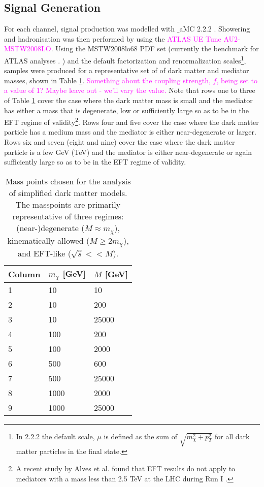 \subsection{Signal Generation}
\label{signal_generation}
\begin{flushleft}
For each channel, signal production was modelled with $\_$aMC 2.2.2 . Showering and hadronisation was then performed by  using the \textcolor{magenta}{ATLAS UE Tune AU2-MSTW2008LO}. Using the MSTW2008lo68 PDF set (currently the benchmark for ATLAS analyses \cite{}. ) and the default \MG factorization and renormalization scales\footnote{In  2.2.2 the default scale, $\mu$ is defined as the sum of $\sqrt{m_{\chi}^{2} + p_{T}^{2}}$ for all dark matter particles in the final state.}, samples were produced for a representative set of of dark matter and mediator masses, shown in Table \ref{Mass_coup_points}. \textcolor{magenta}{Something about the coupling strength, $f$, being set to a value of 1? Maybe leave out - we'll vary the value.} Note that rows one to three of Table \ref{Mass_coup_points} cover the case where the dark matter mass is small and the mediator has either a mass that is degenerate, low or sufficiently large so as to be in the EFT regime of validity\footnote{A recent study by Alves et al. found that EFT results do not apply to mediators with a mass less than 2.5 TeV at the LHC during Run I \cite{Alves:2011wf}.}. Rows four and five cover the case where the dark matter particle has a medium mass and the mediator is either near-degenerate or larger. Rows six and seven (eight and nine) cover the case where the dark matter particle is a few GeV (TeV) and the mediator is either near-degenerate or again sufficiently large so as to be in the EFT regime of validity. 

\begin{table}[!htbp]
\centering
\begin{tabular}{l|l|l}
\hline
\hline
 \rule{0pt}{2.2ex}Column & $m_{\chi}$ [GeV] & $M$ [GeV]\\
\hline
 \rule{0pt}{2.2ex}1 & 10 & 10\\
 2 & 10 & 200\\
 3 & 10 & 25000\\
 4 & 100 & 200\\
 5 & 100 & 2000\\
 6 & 500 & 600\\
 7 & 500 & 25000\\
 8 & 1000 & 2000\\
 9 & 1000 & 25000\\
 \hline
 \hline
\end{tabular}
\caption{Mass points chosen for the analysis of simplified dark matter models. The masspoints are primarily representative of three regimes: (near-)degenerate ($M\approx m_{\chi}$), kinematically allowed ($M \geq 2m_{\chi}$), and EFT-like ($\sqrt{\hat{s}} << M$).}
\label{Mass_coup_points}
\end{table}
\end{flushleft}

